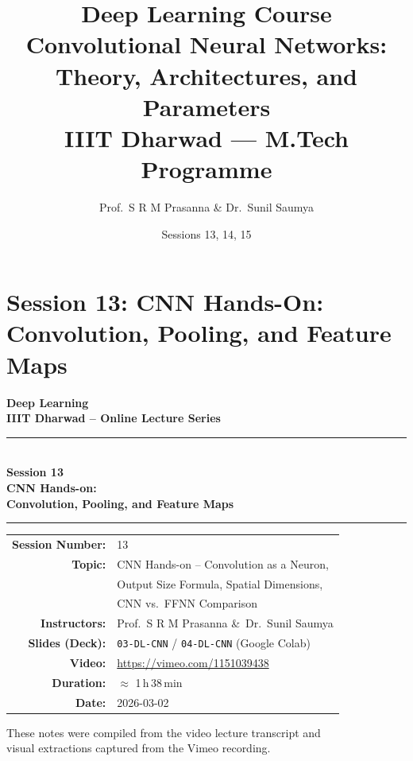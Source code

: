 \documentclass[12pt,a4paper]{article}
\title{%
  {\Large\bfseries Deep Learning Course}\\[6pt]
  {\LARGE Convolutional Neural Networks: Theory, Architectures, and Parameters}\\[4pt]
  {\normalsize IIIT Dharwad --- M.Tech Programme}
}
\author{Prof.\ S R M Prasanna \& Dr.\ Sunil Saumya}
\date{Sessions 13, 14, 15}
\begin{document}
\maketitle
\tableofcontents
\clearpage

\part{Session 13: CNN Hands-On: Convolution, Pooling, and Feature Maps}

\begin{titlepage}
  \centering
  \vspace*{2cm}
  {\LARGE\bfseries Deep Learning\\[0.4em]
   \large IIIT Dharwad -- Online Lecture Series\par}
  \vspace{1.5cm}
  \rule{\textwidth}{1.5pt}\\[0.4em]
  {\Huge\bfseries Session 13\\[0.5em]
   \Large CNN Hands-on:\\[0.3em]
   Convolution, Pooling, and Feature Maps}\\[0.4em]
  \rule{\textwidth}{1.5pt}
  \vspace{1.5cm}

  \begin{tabular}{rl}
    \textbf{Session Number:} & 13 \\[0.3em]
    \textbf{Topic:}          & CNN Hands-on -- Convolution as a Neuron, \\
                             & Output Size Formula, Spatial Dimensions, \\
                             & CNN vs.\ FFNN Comparison \\[0.3em]
    \textbf{Instructors:}    & Prof.\ S R M Prasanna \&\ Dr.\ Sunil Saumya \\[0.3em]
    \textbf{Slides (Deck):}  & \texttt{03-DL-CNN} / \texttt{04-DL-CNN} (Google Colab) \\[0.3em]
    \textbf{Video:}          & \url{https://vimeo.com/1151039438} \\[0.3em]
    \textbf{Duration:}       & $\approx$ 1\,h\,38\,min \\[0.3em]
    \textbf{Date:}           & 2026-03-02 \\
  \end{tabular}

  \vfill
  {\small These notes were compiled from the video lecture transcript and\\
  visual extractions captured from the Vimeo recording.}
\end{titlepage}
\end{document}

